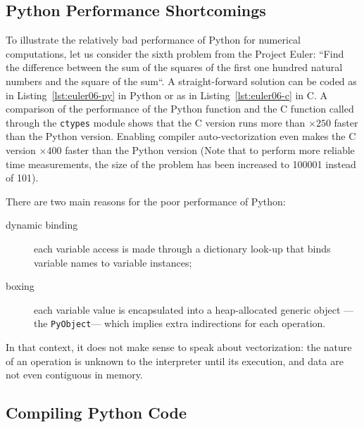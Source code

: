 \documentclass[preprint]{sigplanconf}
\begin{document}
\subsection{Python Performance Shortcomings}

To illustrate the relatively bad performance of Python for numerical
computations, let us consider the sixth problem from the Project Euler: ``Find
the difference between the sum of the squares of the first one hundred natural
numbers and the square of the sum``. A straight-forward solution can be coded
as in Listing~\ref{lst:euler06-py} in Python or as in
Listing~\ref{lst:euler06-c} in C. A comparison of the performance of the Python
function and the C function called through the \texttt{ctypes} module shows
that the C version runs more than $\times250$ faster than the Python version.
Enabling compiler auto-vectorization even makes the C version $\times400$
faster than the Python version (Note that to perform more reliable time
measurements, the size of the problem has been increased to 100001 instead of
101).

There are two main reasons for the poor performance of Python:

\begin{description}

    \item[dynamic binding] each variable access is made through a dictionary
        look-up that binds variable names to variable instances;

    \item[boxing] each variable value is encapsulated into a heap-allocated
        generic object ---the \texttt{PyObject}--- which implies extra
        indirections for each operation.

\end{description}

In that context, it does not make sense to speak about vectorization: the
nature of an operation is unknown to the interpreter until its execution, and
data are not even contiguous in memory.






\subsection{Compiling Python Code}
\end{document}
